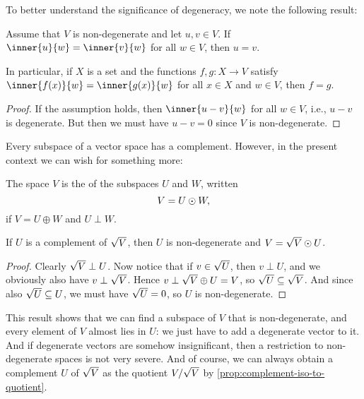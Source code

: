 To better understand the significance of degeneracy, we note the following result:

\begin{lemma}
    \label{lem:non-degenerate-vectors-equal}
    Assume that $V$ is non-degenerate and let $u,v \in V$. If $\inner{u}{w} = \inner{v}{w}$ for all $w \in V$, then $u = v$.

    In particular, if $X$ is a set and the functions $f,g \colon X \to V$ satisfy $\inner{f(x)}{w} = \inner{g(x)}{w}$ for all $x \in X$ and $w \in V$, then $f = g$.
\end{lemma}

\begin{proof}
    If the assumption holds, then $\inner{u-v}{w}$ for all $w \in V$, i.e., $u-v$ is degenerate. But then we must have $u-v = 0$ since $V$ is non-degenerate.
\end{proof}


Every subspace of a vector space has a complement. However, in the present context we can wish for something more:

\begin{definition}
    The space $V$ is the  of the subspaces $U$ and $W$, written
    \begin{equation*}
        V
            = U \odot W,
    \end{equation*}
    if $V = U \oplus W$ and $U \perp W$.
\end{definition}

\begin{proposition}
    If $U$ is a complement of $\sqrt{V}$, then $U$ is non-degenerate and $V = \sqrt{V} \odot U$.
\end{proposition}

\begin{proof}
    Clearly $\sqrt{V} \perp U$. Now notice that if $v \in \sqrt{U}$, then $v \perp U$, and we obviously also have $v \perp \sqrt{V}$. Hence $v \perp \sqrt{V} \oplus U = V$, so $\sqrt{U} \subseteq \sqrt{V}$. And since also $\sqrt{U} \subseteq U$, we must have $\sqrt{U} = 0$, so $U$ is non-degenerate.
\end{proof}
%
This result shows that we can find a subspace of $V$ that is non-degenerate, and every element of $V$ almost lies in $U$: we just have to add a degenerate vector to it. And if degenerate vectors are somehow insignificant, then a restriction to non-degenerate spaces is not very severe. And of course, we can always obtain a complement $U$ of $\sqrt{V}$ as the quotient $V/\sqrt{V}$ by \cref{prop:complement-iso-to-quotient}.

